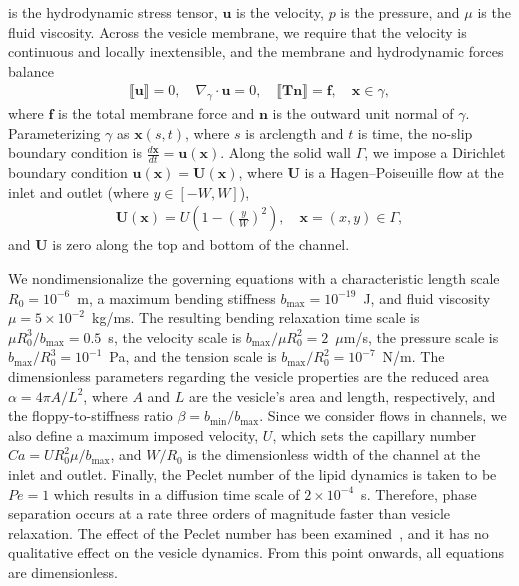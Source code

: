 \documentclass[twoside,twocolumn,9pt]{article}
\newcommand{\ff}{\mathbf{f}}
\newcommand{\nn}{\mathbf{n}}
\newcommand{\uu}{\mathbf{u}}
\newcommand{\TT}{\mathbf{T}}
\newcommand{\UU}{\mathbf{U}}
\newcommand{\xx}{\mathbf{x}}
\begin{document}
is the hydrodynamic stress tensor, $\uu$ is the velocity, $p$ is the
pressure, and $\mu$ is the fluid viscosity. Across the vesicle membrane,
we require that the velocity is continuous and locally inextensible, and
the membrane and hydrodynamic forces balance
\begin{align}
  \llbracket \uu \rrbracket = 0, \quad 
  \nabla_{\gamma} \cdot \uu = 0, \quad
  \llbracket \TT\nn \rrbracket = \ff, \quad \xx \in \gamma,
\end{align}
where $\ff$ is the total membrane force and $\nn$ is the outward unit
normal of $\gamma$. Parameterizing $\gamma$ as $\xx(s,t)$, where $s$ is
arclength and $t$ is time, the no-slip boundary condition is
$\frac{d\xx}{dt} = \uu(\xx)$. Along the solid wall $\Gamma$, we impose a
Dirichlet boundary condition $\uu(\xx) = \UU(\xx)$, where $\UU$ is a
Hagen–Poiseuille flow at the inlet and outlet (where $y\in[-W,W]$),
\begin{align}
  \UU(\xx) = U \left(1 - \left(\frac{y}{W}\right)^2 \right), 
    \quad \xx = (x,y) \in \Gamma,
\end{align}
and $\UU$ is zero along the top and bottom of the channel.

We nondimensionalize the governing equations with a characteristic
length scale $R_0 = 10^{-6}$~m, a maximum bending stiffness $b_{\max} =
10^{-19}$~J, and fluid viscosity $\mu = 5 \times 10^{-2}$~kg/ms. The
resulting bending relaxation time scale is $\mu R_0^3/b_{\max} = 0.5$~s,
the velocity scale is $b_{\max}/\mu R_0^2=2$~$\mu$m/s, the pressure
scale is $b_{\max}/R_0^3 = 10^{-1}$~Pa, and the tension scale is
$b_{\max}/R_0^2 = 10^{-7}$~N/m. The dimensionless parameters regarding
the vesicle properties are the reduced area $\alpha = 4\pi A/L^2$, where
$A$ and $L$ are the vesicle's area and length, respectively, and the
floppy-to-stiffness ratio $\beta = b_{\min}/b_{\max}$. Since we consider
flows in channels, we also define a maximum imposed velocity, $U$, which
sets the capillary number $Ca = U R_{0}^{2} \mu/b_{\max}$, and $W/R_0$
is the dimensionless width of the channel at the inlet and outlet.
Finally, the Peclet number of the lipid dynamics is taken to be $Pe = 1$
which results in a diffusion time scale of $2 \times 10^{-4}$~s.
Therefore, phase separation occurs at a rate three orders of magnitude
faster than vesicle relaxation. The effect of the Peclet number has been
examined~\cite{liu-mar-li-vee-low2017, soh-tse-li-voi-low2010}, and it
has no qualitative effect on the vesicle dynamics. From this point
onwards, all equations are dimensionless.
\end{document}

